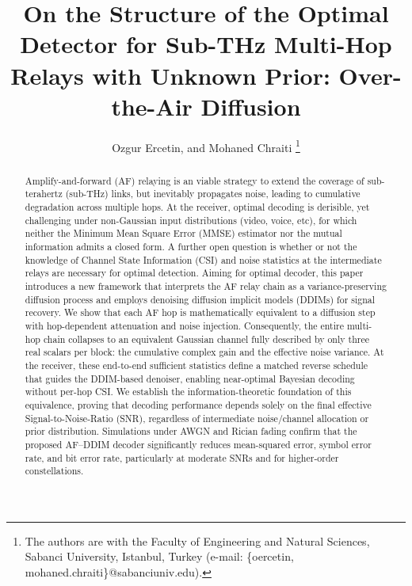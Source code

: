 \documentclass[journal]{IEEEtran}
\begin{document}
\title{On the Structure of the Optimal Detector for Sub-THz Multi-Hop Relays with Unknown Prior: Over-the-Air Diffusion
}

\author{Ozgur Ercetin, and Mohaned Chraiti%
\thanks{The authors are with the Faculty of Engineering and Natural Sciences, Sabanci University, Istanbul, Turkey (e-mail: \{oercetin, mohaned.chraiti\}@sabanciuniv.edu).}%
}


\maketitle

\begin{abstract}
Amplify-and-forward (AF) relaying is an viable strategy to extend the coverage of sub-terahertz (sub-THz) links, but inevitably propagates noise, leading to cumulative degradation across multiple hops. At the receiver, optimal decoding is derisible, yet challenging under non-Gaussian input distributions (video, voice, etc), for which neither the Minimum Mean Square Error (MMSE) estimator nor the mutual information admits a closed form. A further open question is whether or not the knowledge of Channel State Information (CSI) and noise statistics at the intermediate relays are necessary for optimal detection. Aiming for optimal decoder, this paper introduces a new framework that interprets the AF relay chain as a variance-preserving diffusion process and employs denoising diffusion implicit models (DDIMs) for signal recovery. We show that each AF hop is mathematically equivalent to a diffusion step with hop-dependent attenuation and noise injection. Consequently, the entire multi-hop chain collapses to an equivalent Gaussian channel fully described by only three real scalars per block: the cumulative complex gain and the effective noise variance. At the receiver, these end-to-end sufficient statistics define a matched reverse schedule that guides the DDIM-based denoiser, enabling near-optimal Bayesian decoding without per-hop CSI. We establish the information-theoretic foundation of this equivalence, proving that decoding performance depends solely on the final effective Signal-to-Noise-Ratio (SNR), regardless of intermediate noise/channel allocation or prior distribution. Simulations under AWGN and Rician fading confirm that the proposed AF–DDIM decoder significantly reduces mean-squared error, symbol error rate, and bit error rate, particularly at moderate SNRs and for higher-order constellations.




\end{abstract}
\end{document}
